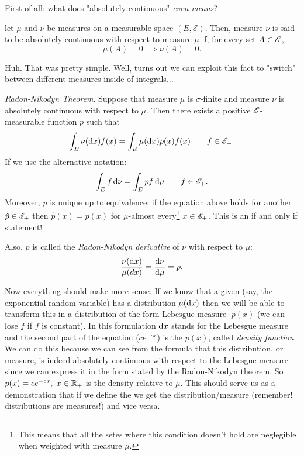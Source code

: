 \documentclass{report}
\begin{document}
	\begin{revise}
		First of all: what does "absolutely continuous" \textit{even means}?
		\begin{definition}
			let $\mu$ and $\nu$ be measures on a measurable space $(E,\mathscr{E})$. Then, measure $\nu$ is said to be absolutely continuous with respect to measure $\mu$ if, for every set $A\in\mathscr{E}$,
			\[\mu(A)=0\implies\nu(A)=0.\]
		\end{definition}
		Huh. That was pretty simple. Well, turns out we can exploit this fact to "switch" between different measures inside of integrals...
		\begin{theorem}
			\emph{Radon-Nikodyn Theorem}.
			Suppose that measure $\mu$ is $\sigma$-finite and measure $\nu$ is absolutely continuous with respect to $\mu$. Then there exists a positive $\mathscr{E}$-measurable function $p$ such that 
			\[\int_E\nu(\mathop{}\!\mathrm{d} x)f(x)=\int_E\mu(\mathop{}\!\mathrm{d} x)p(x)f(x)\qquad f\in\mathscr{E}_+.\]
			If we use the alternative notation:
			\[\int_Ef\mathop{}\!\mathrm{d}\nu =\int_Ep f\mathop{}\!\mathrm{d}\mu \qquad f\in\mathscr{E}_+.\]
			Moreover, $p$ is unique up to equivalence: if the equation above holds for another $\hat{p}\in\mathscr{E}_+$ then $\hat{p}(x)=p(x)$ for $\mu$-almost every\footnote{This means that all the setes where this condition doesn't hold are neglegible when weighted with measure $\mu$.} $x\in\mathscr{E}_+$. This is an if and only if statement!\par
			Also, $p$ is called the \emph{Radon-Nikodyn derivative} of $\nu$ with respect to $\mu$:
			\[\frac{\nu(\mathop{}\!\mathrm{d} x)}{\mu(dx)}=\frac{\mathop{}\!\mathrm{d}\nu}{\mathop{}\!\mathrm{d}\mu}=p.\]
		\end{theorem}
	\end{revise}
	Now everything should make more sense. If we know that a given \rv{} (say, the exponential random variable) has a distribution $\mu(\mathop{}\!\mathrm{d} x)$ then we will be able to transform this in a distribution of the form $\text{Lebesgue measure}\cdot p(x)$ (we can lose $f$ if $f$ is constant).
	In this formulation	$\mathop{}\!\mathrm{d} x$ stands for the Lebesgue measure and the second part of the equation ($ce^{-cx}$) is the $p(x)$, called \emph{density function}. We can do this because we can see from the formula that this distribution, or measure, is indeed absolutely continuous with respect to the Lebesgue measure since we can express it in the form stated by the Radon-Nikodyn theorem.
	 So $p(x)=ce^{-cx},\;x\in\mathbb{R}_+$ is the density relative to $\mu$. This should serve us as a demonstration that if we define the \rv{} we get the distribution/measure (remember! distributions are measures!) and vice versa.
\end{document}
